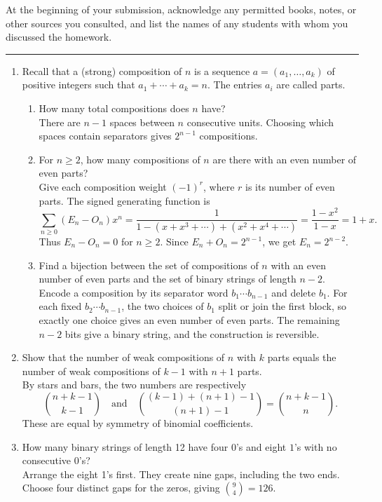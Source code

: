 \documentclass[11pt]{article}
\begin{document}
At the beginning of your submission, acknowledge any permitted books, notes, or
other sources you consulted, and list the names of any students with whom you
discussed the homework.
\vspace{0.5em}\hrule\vspace{1em}
\begin{enumerate}
\item Recall that a (strong) composition of $n$ is a sequence $a=(a_1,\ldots,a_k)$ of positive integers such that $a_1+\cdots+a_k=n$. The entries $a_i$ are called parts.
\begin{enumerate}
\item[(a)] How many total compositions does $n$ have?\\
  There are $n-1$ spaces between $n$ consecutive units. Choosing which spaces contain separators gives $2^{n-1}$ compositions.
\item[(b)] For $n\ge 2$, how many compositions of $n$ are there with an even number of even parts?\\
  Give each composition weight $(-1)^r$, where $r$ is its number of even parts. The signed generating function is
\[
\sum_{n\ge0}(E_n-O_n)x^n=\frac{1}{1-(x+x^3+\cdots)+(x^2+x^4+\cdots)}=\frac{1-x^2}{1-x}=1+x.
\]
Thus $E_n-O_n=0$ for $n\ge2$. Since $E_n+O_n=2^{n-1}$, we get $E_n=2^{n-2}$.
\item[(c)] Find a bijection between the set of compositions of $n$ with an even number of even parts and the set of binary strings of length $n-2$.\\
  Encode a composition by its separator word $b_1\cdots b_{n-1}$ and delete $b_1$. For each fixed $b_2\cdots b_{n-1}$, the two choices of $b_1$ split or join the first block, so exactly one choice gives an even number of even parts. The remaining $n-2$ bits give a binary string, and the construction is reversible.
\end{enumerate}
\item Show that the number of weak compositions of $n$ with $k$ parts equals the number of weak compositions of $k-1$ with $n+1$ parts.\\
  By stars and bars, the two numbers are respectively
\[
\binom{n+k-1}{k-1}\quad\text{and}\quad \binom{(k-1)+(n+1)-1}{(n+1)-1}=\binom{n+k-1}{n}.
\]
These are equal by symmetry of binomial coefficients.
\item How many binary strings of length 12 have four $0$'s and eight $1$'s with no consecutive $0$'s?\\
  Arrange the eight 1's first. They create nine gaps, including the two ends. Choose four distinct gaps for the zeros, giving $\binom94=126$.

\end{enumerate}
\end{document}
